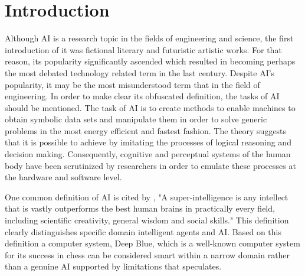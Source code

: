 \documentclass[man]{apa6}
\begin{document}
\section{Introduction}
Although AI is a research topic in the fields of engineering and science, the first introduction of it was fictional literary and futuristic artistic works. For that reason, its popularity significantly
ascended which resulted in becoming perhaps the most debated technology related term in the last century. Despite AI's popularity, it may be the most misunderstood term that in the field of engineering. In order to make clear its obfuscated definition, the tasks of AI should be mentioned. The task of AI is to create methods to enable machines to obtain symbolic data sets and manipulate them in order to solve generic problems in the most energy efficient and fastest fashion. The theory suggests that it is possible to achieve by imitating the processes of logical reasoning and decision making. Consequently, cognitive and perceptual systems of the human body have been scrutinized by researchers in order to emulate these processes at the hardware and software level.\par
One common definition of AI is cited by , "A super-intelligence is any intellect that is vastly outperforms the best human brains in practically every field, including scientific creativity, general wisdom and social skills." This definition clearly distinguishes specific domain intelligent agents and AI. Based on this definition a computer system, Deep Blue, which is a well-known computer system for its success in chess can be considered smart within a narrow domain rather than a genuine AI supported by limitations that \citeauthor{duff} \citeyear[p.~34]{duff} speculates. 
\end{document}
